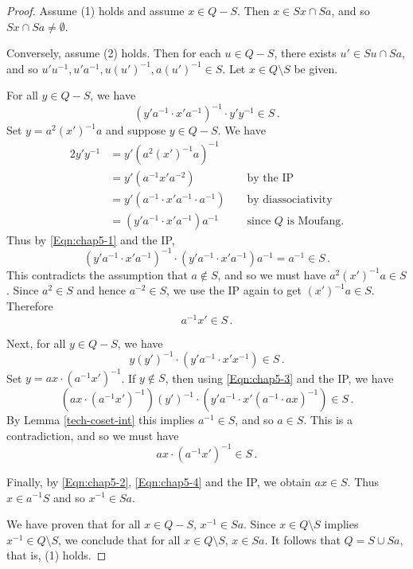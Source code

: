 \documentclass[12pt, twoside, openright]{report}
\theoremstyle{definition}
\begin{document}
\begin{proof}
  Assume (1) holds and assume $x\in Q- S$. Then $x\in Sx\cap Sa$, and so $Sx\cap Sa\neq\emptyset$.
  
  Conversely, assume (2) holds. Then for each $u\in Q- S$, there exists $u'\in Su\cap Sa$, and
    so $u'u^{-1}, u'a^{-1}, u(u')^{-1}, a(u')^{-1}\in S$. Let $x\in Q\setminus S$ be given.
  
  For all $y\in Q- S$, we have
  \begin{equation}\label{Eqn:chap5-1}
  (y'a^{-1}\cdot x'a^{-1})^{-1}\cdot y'y^{-1}\in S\,.
  \end{equation}
  Set $y = a^2(x')^{-1}a$ and suppose $y\in Q- S$. 
  We have
  \begin{alignat*}{2}
  y'y^{-1}
      &= y'(a^2(x')^{-1}a)^{-1}               && \\
      &= y'(a^{-1}x'a^{-2})                   && \text{ by the IP} \\
      &= y'(a^{-1}\cdot x'a^{-1}\cdot a^{-1}) && \text{ by diassociativity} \\
      &= (y'a^{-1}\cdot x'a^{-1})a^{-1}       && \text{ since }Q\text{ is Moufang.}
  \end{alignat*}
  Thus by \eqref{Eqn:chap5-1} and the IP,
  \[
  (y'a^{-1}\cdot x'a^{-1})^{-1}\cdot (y'a^{-1}\cdot x'a^{-1})a^{-1} = a^{-1}\in S\,.
  \]
  This contradicts the assumption that $a\not\in S$, and so we must have $a^2(x')^{-1}a\in S$.
    Since $a^2\in S$ and hence $a^{-2}\in S$, we use the IP again to get $(x')^{-1}a\in S$. Therefore
  \begin{equation}\label{Eqn:chap5-2}
  a^{-1}x'\in S\,.
  \end{equation}
  
  Next, for all $y\in Q- S$, we have
  \begin{equation}\label{Eqn:chap5-3}
  y(y')^{-1}\cdot (y'a^{-1}\cdot x'x^{-1})\in S\,.
  \end{equation}
  Set $y = ax\cdot (a^{-1}x')^{-1}$. If $y\not\in S$, then using \eqref{Eqn:chap5-3} and the IP, we have
  \[
  (ax\cdot (a^{-1}x')^{-1})(y')^{-1}\cdot (y'a^{-1}\cdot x'(a^{-1}\cdot ax)^{-1})\in S\,.
  \]
  By Lemma \ref{tech-coset-int} this implies $a^{-1}\in S$, and so $a\in S$. This is a contradiction, and so we must
  have
  \begin{equation}\label{Eqn:chap5-4}
  ax\cdot (a^{-1}x')^{-1}\in S\,.
  \end{equation}
  
  Finally, by \eqref{Eqn:chap5-2}, \eqref{Eqn:chap5-4} and the IP, we obtain $ax\in S$. Thus $x\in a^{-1}S$
  and so $x^{-1}\in Sa$. 
  
  We have proven that for all $x\in Q- S$, $x^{-1}\in Sa$. Since $x\in Q\setminus S$ implies
    $x^{-1}\in Q\setminus S$, we conclude that for all $x\in Q\setminus S$, $x\in Sa$. It follows that
  $Q= S\cup Sa$, that is, (1) holds.
\end{proof}
\end{document}
